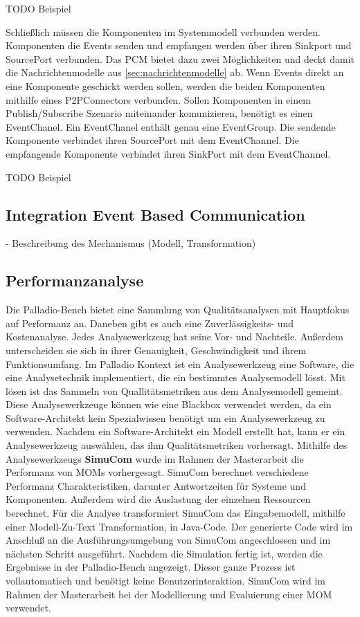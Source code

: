 TODO Beispiel

Schließlich müssen die Komponenten im Systemmodell verbunden werden. Komponenten die Events senden und empfangen werden über ihren Sinkport und SourcePort verbunden. Das PCM bietet dazu zwei Möglichkeiten und deckt damit die Nachrichtenmodelle aus \autoref{sec:nachrichtenmodelle} ab. Wenn Events direkt an eine Komponente geschickt werden sollen, werden die beiden Komponenten mithilfe eines P2PConnectors verbunden. Sollen Komponenten in einem Publish/Subscribe Szenario miteinander komunizieren, benötigt es einen EventChanel. Ein EventChanel enthält genau eine EventGroup. Die sendende Komponente verbindet ihren SourcePort mit dem EventChannel. Die empfangende Komponente verbindet ihren SinkPort mit dem EventChannel. 

TODO Beispiel



\subsection{Integration Event Based Communication}
\label{sec:eventbasetransformation}
- Beschreibung des Mechanismus (Modell, Transformation)

\subsection{Performanzanalyse}
Die Palladio-Bench bietet eine Sammlung von Qualitätsanalysen mit Hauptfokus auf Performanz an. Daneben gibt es auch eine Zuverlässigkeits- und Kostenanalyse. Jedes Analysewerkzeug hat seine Vor- und Nachteile. Außerdem unterscheiden sie sich in ihrer Genauigkeit, Geschwindigkeit und ihrem Funktionsumfang. Im Palladio Kontext ist ein Analysewerkzeug eine Software, die eine Analysetechnik implementiert, die ein bestimmtes Analysemodell lösst. Mit lösen ist das Sammeln von Quallitätsmetriken aus dem Analysemodell gemeint. Diese Analysewerkzeuge können wie eine Blackbox verwendet werden, da ein Software-Architekt kein Spezialwissen benötigt um ein Analysewerkzeug zu verwenden. Nachdem ein Software-Architekt ein Modell erstellt hat, kann er ein Analysewerkzeug auswählen, das ihm Qualitätsmetriken vorhersagt. Mithilfe des Analysewerkzeugs \textbf{SimuCom} wurde im Rahmen der Masterarbeit die Performanz von MOMs vorhergesagt. SimuCom berechnet verschiedene Performanz Charakteristiken, darunter Antwortzeiten für Systeme und Komponenten. Außerdem wird die Auslastung der einzelnen Ressourcen berechnet. Für die Analyse transformiert SimuCom das Eingabemodell, mithilfe einer Modell-Zu-Text Transformation, in Java-Code. Der generierte Code wird im Anschluß an die Ausführungsumgebung von SimuCom angeschlossen und im nächsten Schritt ausgeführt. Nachdem die Simulation fertig ist, werden die Ergebnisse in der Palladio-Bench angezeigt. Dieser ganze Prozess ist vollautomatisch und benötigt keine Benutzerinteraktion. SimuCom wird im Rahmen der Masterarbeit bei der Modellierung und Evaluierung einer MOM verwendet.

